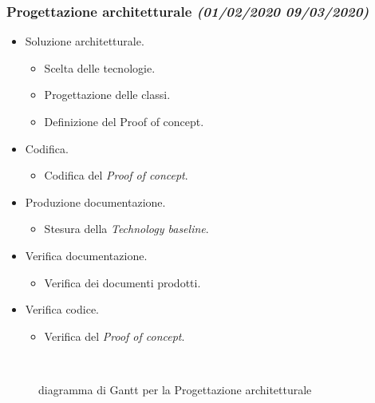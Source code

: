 \documentclass[../piano-di-progetto.tex]{subfiles}
\begin{document}
\subsubsection[Progettazione architetturale]{Progettazione architetturale {\normalsize\normalfont\itshape(01/02/2020  09/03/2020)}}%
\label{subs:progettazione_architetturale}
\begin{itemize}
  \item Soluzione architetturale.
  \begin{itemize}
    \item Scelta delle tecnologie.
    \item Progettazione delle classi.
    \item Definizione del \textit{}{Proof of concept}.
  \end{itemize}
  \item Codifica.
  \begin{itemize}
    \item Codifica del \textit{Proof of concept}.
  \end{itemize}
  \item Produzione documentazione.
  \begin{itemize}
    \item Stesura della \textit{Technology baseline}.
  \end{itemize}
  \item Verifica documentazione.
  \begin{itemize}
    \item Verifica dei documenti prodotti.
  \end{itemize}
  \item Verifica codice.
  \begin{itemize}
    \item Verifica del \textit{Proof of concept}.
  \end{itemize}
\end{itemize}
\begin{figure}[H]
  \centering
  
  \caption{diagramma di Gantt per la Progettazione architetturale}%
~~\label{fig:gantt_progettazione_architetturale}
\end{figure}
\end{document}
